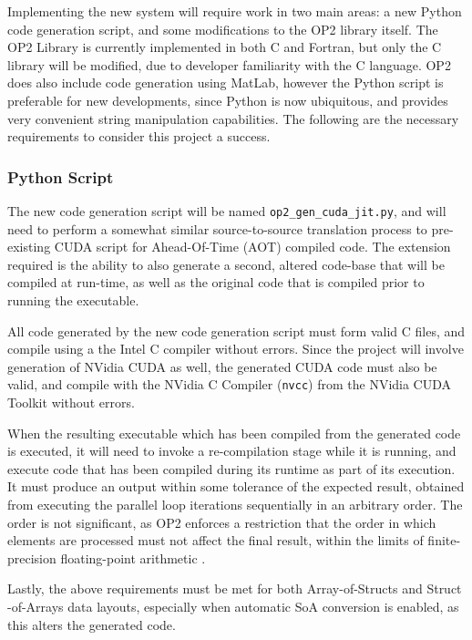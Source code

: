 Implementing the new system will require work in two main areas: a new Python code generation script, and some modifications to the OP2 library itself. The OP2 Library is currently implemented in both C and Fortran, but only the C library will be modified, due to developer familiarity with the C language. OP2 does also include code generation using MatLab, however the Python script is preferable for new developments, since Python is now ubiquitous, and provides very convenient string manipulation capabilities. The following are the necessary requirements to consider this project a success.

\subsubsection{Python Script}
The new code generation script will be named \verb|op2_gen_cuda_jit.py|, and will need to perform a somewhat similar source-to-source translation process to pre-existing CUDA script for Ahead-Of-Time (AOT) compiled code. The extension required is the ability to also generate a second, altered code-base that will be compiled at run-time, as well as the original code that is compiled prior to running the executable.
\par
All code generated by the new code generation script must form valid C files, and compile using a the Intel C compiler \cite{icc} without errors. Since the project will involve generation of NVidia CUDA as well, the generated CUDA code must also be valid, and compile with the NVidia C Compiler (\verb|nvcc|) from the NVidia CUDA Toolkit \cite{nvcc,toolkit} without errors.
\par
When the resulting executable which has been compiled from the generated code is executed, it will need to invoke a re-compilation stage while it is running, and execute code that has been compiled during its runtime as part of its execution. It must produce an output within some tolerance of the expected result, obtained from executing the parallel loop iterations sequentially in an arbitrary order. The order is not significant, as OP2 enforces a restriction that the order in which elements are processed must not affect the final result, within the limits of finite-precision floating-point arithmetic \cite[p3]{op2main}.
\par
Lastly, the above requirements must be met for both Array-of-Structs and Struct\\-of-Arrays data layouts, especially when automatic SoA conversion is enabled, as this alters the generated code.

